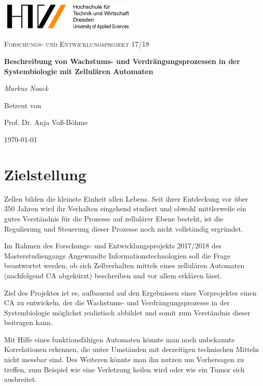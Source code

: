 \documentclass[11pt,a4paper,pointlessnumbers]{scrreprt}  %
\begin{document}
	\begin{titlepage}
		\centering
		\includegraphics[width=0.5\textwidth]{Htw-dresden-logo}\par\vspace{1cm}
		{\scshape\Large Forschungs- und Entwicklungsprojekt 17/18\par}
		\vspace{1.5cm}
		{\huge\bfseries Beschreibung von Wachstums- und
			Verdrängungsprozessen in der Systembiologie mit
			Zellulären Automaten\par}
		\vspace{2cm}
		{\Large\itshape Markus Noack\par}
		\vfill
		Betreut von\par
		Prof. Dr. Anja Voß-Böhme
		
		\vfill
		
		{\large \today\par}
	\end{titlepage}

\tableofcontents 

\chapter{Zielstellung}
Zellen bilden die kleinste Einheit allen Lebens. Seit ihrer Entdeckung vor über 350 Jahren wird ihr Verhalten eingehend studiert und obwohl mittlerweile ein gutes Verständnis für die Prozesse auf zellulärer Ebene besteht, ist die Regulierung und Steuerung dieser Prozesse noch nicht vollständig ergründet. \par
Im Rahmen des Forschungs- und Entwicklungsprojekts 2017/2018 des Masterstudiengangs Angewandte Informationstechnologien soll die Frage beantwortet werden, ob sich Zellverhalten mittels eines zellulären Automaten (nachfolgend CA abgekürzt) beschreiben und vor allem erklären lässt. \par
Ziel des Projektes ist es, aufbauend auf den Ergebnissen eines Vorprojektes einen CA zu entwickeln, der die Wachstums- und Verdrängungsprozesse in der Systembiologie möglichst realistisch abbildet und somit zum Verständnis dieser beitragen kann.\par 
Mit Hilfe eines funktionsfähigen Automaten könnte man noch unbekannte Korrelationen erkennen, die unter Umständen mit derzeitigen technischen Mitteln nicht messbar sind. Des Weiteren könnte man ihn nutzen um Vorhersagen zu treffen, zum Beispiel wie eine Verletzung heilen wird oder wie ein Tumor sich ausbreitet.\par
\end{document}
